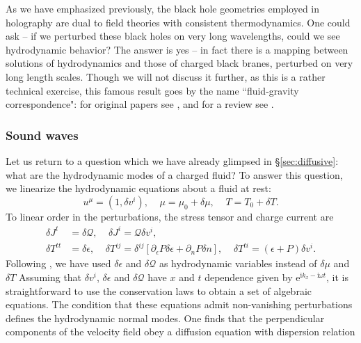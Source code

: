 \documentclass[10pt, oneside]{book}
\begin{document}
\begin{doublespace}
As we have emphasized previously, the black hole geometries employed in holography are dual to field theories with consistent thermodynamics.   One could ask -- if we perturbed these black holes on very long wavelengths, could we see hydrodynamic behavior?  The answer is yes -- in fact there is a mapping between solutions of hydrodynamics and those of charged black branes, perturbed on very long length scales.   Though we will not discuss it further, as this is a rather technical exercise, this famous result goes by the name ``fluid-gravity correspondence":  for original papers see \cite{Bhattacharyya:2008jc, Banerjee:2008th, Erdmenger:2008rm}, and for a review see \cite{Hubeny:2011hd}.



\subsubsection{Sound waves}
Let us return to a question which we have already glimpsed in \S \ref{sec:diffusive}:  what are the hydrodynamic modes of a charged fluid?
To answer this question, we linearize the hydrodynamic equations about a fluid at rest:  \begin{equation}
u^\mu = (1, \delta v^i), \;\;\;\; \mu = \mu_0+\delta\mu,\;\;\;\; T = T_0+\delta T.  \label{eq:deltav}
\end{equation}
To linear order in the perturbations, the stress tensor and charge current are \begin{subequations}\begin{align}
\delta J^t &= \delta \mathcal{Q}, \;\;\;\; \delta J^i = \mathcal{Q}\delta v^i, \\
\delta T^{tt} &= \delta \epsilon, \;\;\;\; \delta T^{ij} = \delta^{ij}\left[ \partial_\epsilon P \delta \epsilon + \partial_n P \delta n\right], \;\;\;\; \delta T^{ti} = (\epsilon+P)\delta v^i.
\end{align}\end{subequations}
Following \cite{Kovtun:2012rj}, we have used $\delta \epsilon$ and $\delta \mathcal{Q}$ as hydrodynamic variables instead of $\delta \mu$ and $\delta T$ Assuming that $\delta v^i$, $\delta \epsilon$ and $\delta \mathcal{Q}$ have $x$ and $t$ dependence given by $\mathrm{e}^{\mathrm{i}k_x - \mathrm{i}\omega t}$, it is straightforward to use the conservation laws to obtain a set of algebraic equations.  The condition that these equations admit non-vanishing perturbations defines the hydrodynamic normal modes.  One finds that the perpendicular components of the velocity field obey a diffusion equation with dispersion relation \begin{equation}

\end{equation}
\end{doublespace}
\end{document}
